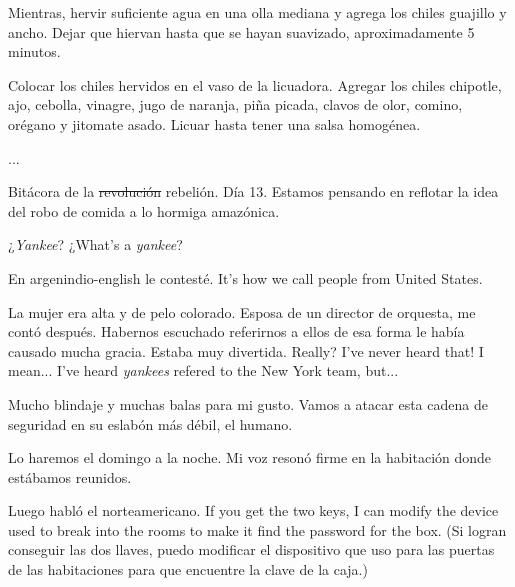 \documentclass[12pt,twoside,openright,a5paper]{book}
\begin{document}
Mientras, hervir suficiente agua en una olla mediana y agrega los
chiles guajillo y ancho. Dejar que hiervan hasta que se hayan suavizado,
aproximadamente 5 minutos.

Colocar los chiles hervidos en el vaso de la licuadora. Agregar los
chiles chipotle, ajo, cebolla, vinagre, jugo de naranja, piña picada,
clavos de olor, comino, orégano y jitomate asado. Licuar hasta tener una
salsa homogénea.

...

\vspace{0.5cm}

\hrulefill\hspace{0.2cm} \decofourleft\decofourright \hspace{0.2cm} \hrulefill
\vspace{0.5cm}

Bitácora de la \st{revolución} rebelión. Día 13. Estamos pensando en reflotar la idea
del robo de comida a lo hormiga amazónica.

\vspace{0.5cm}

\hrulefill\hspace{0.2cm} \decofourleft\decofourright \hspace{0.2cm} \hrulefill
\vspace{0.5cm}

¿\emph{Yankee}? ¿What's a \emph{yankee}?

En argenindio-english le contesté. It's how we call people from United States.

La mujer era alta y de pelo colorado. Esposa de un director de orquesta, me contó después. Habernos escuchado referirnos a ellos de esa forma le había causado mucha gracia. Estaba muy divertida. Really? I've never heard that! I mean... I've heard \emph{yankees} refered to the New York team, but...

\vspace{0.5cm}

\hrulefill\hspace{0.2cm} \decofourleft\decofourright \hspace{0.2cm} \hrulefill
\vspace{0.5cm}

Mucho blindaje y muchas balas para mi gusto. Vamos a atacar esta cadena
de seguridad en su eslabón más débil, el humano.

Lo haremos el domingo a la noche. Mi voz resonó firme en la habitación
donde estábamos reunidos.

Luego habló el norteamericano.
If you get the two keys, I can modify the device used to break into the rooms
to make it find the password for the box. (Si logran conseguir las dos llaves, puedo
modificar el dispositivo que uso para las puertas de las habitaciones para
que encuentre la clave de la caja.)
\end{document}
